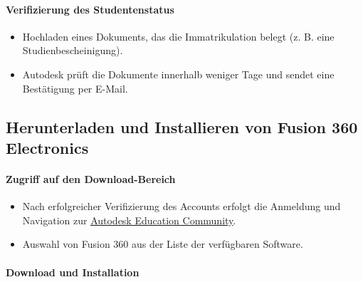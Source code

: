 \paragraph*{ Verifizierung des Studentenstatus}
\begin{itemize}
	\item Hochladen eines Dokuments, das die Immatrikulation belegt (z. B. eine Studienbescheinigung).
	\item Autodesk prüft die Dokumente innerhalb weniger Tage und sendet eine Bestätigung per E-Mail.
\end{itemize}

\subsection*{Herunterladen und Installieren von Fusion 360 Electronics}

\paragraph{Zugriff auf den Download-Bereich}
\begin{itemize}
	\item Nach erfolgreicher Verifizierung des Accounts erfolgt die Anmeldung und Navigation zur \href{https://www.autodesk.com/education/home}{\underline{Autodesk Education Community}}.
	\item Auswahl von Fusion 360 aus der Liste der verfügbaren Software.
\end{itemize}

\paragraph{ Download und Installation}

